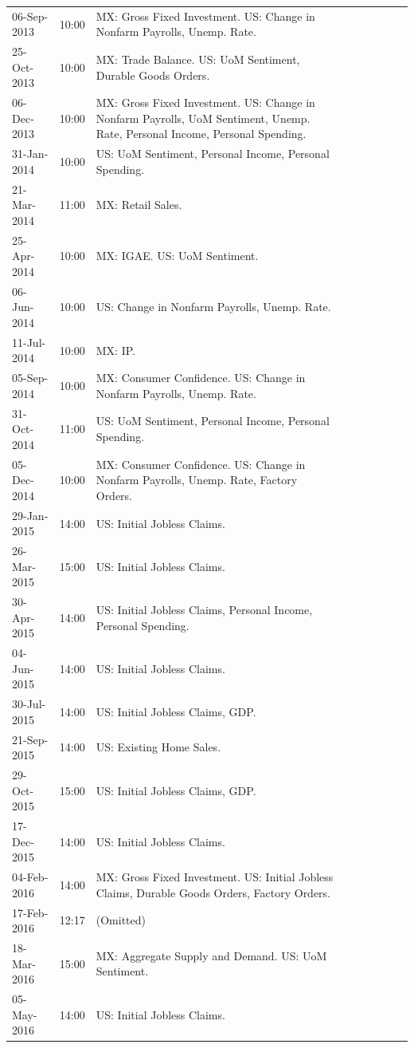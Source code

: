 \documentclass[a4paper,12pt]{article} 		%
\begin{document}
\begin{tiny}
\begin{center}
\begin{longtable}{p{1.8cm}p{1cm}p{11.7cm}p{1.8cm}p{1cm}p{11.7cm}p{1.8cm}p{1cm}p{11.7cm}}
			06-Sep-2013 & 10:00 & MX: Gross Fixed Investment. US: Change in Nonfarm Payrolls, Unemp. Rate. \\
			25-Oct-2013 & 10:00 & MX: Trade Balance. US: UoM Sentiment, Durable Goods Orders. \\
			06-Dec-2013 & 10:00 & MX: Gross Fixed Investment. US: Change in Nonfarm Payrolls, UoM Sentiment, Unemp. Rate, Personal Income, Personal Spending. \\
			31-Jan-2014 & 10:00 & US: UoM Sentiment, Personal Income, Personal Spending. \\
			21-Mar-2014 & 11:00 & MX: Retail Sales. \\
			25-Apr-2014 & 10:00 & MX: IGAE. US: UoM Sentiment. \\
			06-Jun-2014 & 10:00 & US: Change in Nonfarm Payrolls, Unemp. Rate. \\
			11-Jul-2014 & 10:00 & MX: IP. \\
			05-Sep-2014 & 10:00 & MX: Consumer Confidence. US: Change in Nonfarm Payrolls, Unemp. Rate. \\
			31-Oct-2014 & 11:00 & US: UoM Sentiment, Personal Income, Personal Spending. \\
			05-Dec-2014 & 10:00 & MX: Consumer Confidence. US: Change in Nonfarm Payrolls, Unemp. Rate, Factory Orders. \\
			29-Jan-2015 & 14:00 & US: Initial Jobless Claims. \\
			26-Mar-2015 & 15:00 & US: Initial Jobless Claims. \\
			30-Apr-2015 & 14:00 & US: Initial Jobless Claims, Personal Income, Personal Spending. \\
			04-Jun-2015 & 14:00 & US: Initial Jobless Claims. \\
			30-Jul-2015 & 14:00 & US: Initial Jobless Claims, GDP. \\
			21-Sep-2015 & 14:00 & US: Existing Home Sales. \\
			29-Oct-2015 & 15:00 & US: Initial Jobless Claims, GDP. \\
			17-Dec-2015 & 14:00 & US: Initial Jobless Claims. \\
			04-Feb-2016 & 14:00 & MX: Gross Fixed Investment. US: Initial Jobless Claims, Durable Goods Orders, Factory Orders. \\
			17-Feb-2016 & 12:17 & (Omitted) \\
			18-Mar-2016 & 15:00 & MX: Aggregate Supply and Demand. US: UoM Sentiment. \\
			05-May-2016 & 14:00 & US: Initial Jobless Claims. \\

\end{longtable}
\end{center}
\end{tiny}
\end{document}

